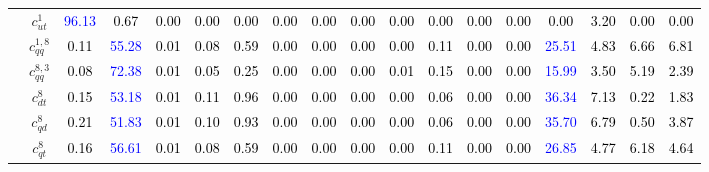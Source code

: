 \documentclass{article}
\begin{document}
\begin{landscape}
\begin{table}[H]
\begin{tabular}{|c|c|c|c|c|c|c|c|c|c|c|c|c|c|c|c|c|c|}
 & $c_{ut}^{1}$ & \textcolor{blue}{96.13} & \textcolor{black}{0.67} & \textcolor{black}{0.00} & \textcolor{black}{0.00} & \textcolor{black}{0.00} & \textcolor{black}{0.00} & \textcolor{black}{0.00} & \textcolor{black}{0.00} & \textcolor{black}{0.00} & \textcolor{black}{0.00} & \textcolor{black}{0.00} & \textcolor{black}{0.00} & \textcolor{black}{0.00} & \textcolor{black}{3.20} & \textcolor{black}{0.00} & \textcolor{black}{0.00}\\ \cline{2-18}
 & $c_{qq}^{1,8}$ & \textcolor{black}{0.11} & \textcolor{blue}{55.28} & \textcolor{black}{0.01} & \textcolor{black}{0.08} & \textcolor{black}{0.59} & \textcolor{black}{0.00} & \textcolor{black}{0.00} & \textcolor{black}{0.00} & \textcolor{black}{0.00} & \textcolor{black}{0.11} & \textcolor{black}{0.00} & \textcolor{black}{0.00} & \textcolor{blue}{25.51} & \textcolor{black}{4.83} & \textcolor{black}{6.66} & \textcolor{black}{6.81}\\ \cline{2-18}
 & $c_{qq}^{8,3}$ & \textcolor{black}{0.08} & \textcolor{blue}{72.38} & \textcolor{black}{0.01} & \textcolor{black}{0.05} & \textcolor{black}{0.25} & \textcolor{black}{0.00} & \textcolor{black}{0.00} & \textcolor{black}{0.00} & \textcolor{black}{0.01} & \textcolor{black}{0.15} & \textcolor{black}{0.00} & \textcolor{black}{0.00} & \textcolor{blue}{15.99} & \textcolor{black}{3.50} & \textcolor{black}{5.19} & \textcolor{black}{2.39}\\ \cline{2-18}
 & $c_{dt}^{8}$ & \textcolor{black}{0.15} & \textcolor{blue}{53.18} & \textcolor{black}{0.01} & \textcolor{black}{0.11} & \textcolor{black}{0.96} & \textcolor{black}{0.00} & \textcolor{black}{0.00} & \textcolor{black}{0.00} & \textcolor{black}{0.00} & \textcolor{black}{0.06} & \textcolor{black}{0.00} & \textcolor{black}{0.00} & \textcolor{blue}{36.34} & \textcolor{black}{7.13} & \textcolor{black}{0.22} & \textcolor{black}{1.83}\\ \cline{2-18}
 & $c_{qd}^{8}$ & \textcolor{black}{0.21} & \textcolor{blue}{51.83} & \textcolor{black}{0.01} & \textcolor{black}{0.10} & \textcolor{black}{0.93} & \textcolor{black}{0.00} & \textcolor{black}{0.00} & \textcolor{black}{0.00} & \textcolor{black}{0.00} & \textcolor{black}{0.06} & \textcolor{black}{0.00} & \textcolor{black}{0.00} & \textcolor{blue}{35.70} & \textcolor{black}{6.79} & \textcolor{black}{0.50} & \textcolor{black}{3.87}\\ \cline{2-18}
 & $c_{qt}^{8}$ & \textcolor{black}{0.16} & \textcolor{blue}{56.61} & \textcolor{black}{0.01} & \textcolor{black}{0.08} & \textcolor{black}{0.59} & \textcolor{black}{0.00} & \textcolor{black}{0.00} & \textcolor{black}{0.00} & \textcolor{black}{0.00} & \textcolor{black}{0.11} & \textcolor{black}{0.00} & \textcolor{black}{0.00} & \textcolor{blue}{26.85} & \textcolor{black}{4.77} & \textcolor{black}{6.18} & \textcolor{black}{4.64}\\ \cline{2-18}

\end{tabular}
\end{table}
\end{landscape}
\end{document}
